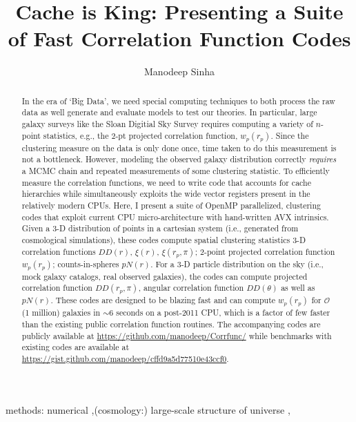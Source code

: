 \documentclass[preprint,authoryear,12pt]{elsarticle}
\newcommand{\xir}{\ensuremath{{DD(r)}}\xspace}
\newcommand{\xiofr}{\ensuremath{{\xi(r)}}\xspace}
\newcommand{\wprp}{\ensuremath{{w_p(r_p)}}\xspace}
\newcommand{\xirppi}{\ensuremath{{\xi(r_p,\pi)}}\xspace}
\newcommand{\cis}{\ensuremath{{pN(r)}}\xspace}
\newcommand{\ddrppi}{\ensuremath{{DD(r_p,\pi)}}\xspace}
\newcommand{\wtheta}{\ensuremath{{DD(\theta)}}\xspace}
\begin{document}
\begin{frontmatter}

\title{Cache is King: Presenting a Suite of Fast Correlation Function Codes}

\author[ms]{Manodeep Sinha}
\address[ms]{6902 Stevenson Center, Department of Physics \& Astronomy, Vanderbilt University, Nashville, TN 37235}

\begin{abstract}
In the era of `Big Data', we need special computing techniques to both process the raw data as well 
generate and evaluate models to test our theories. In particular, large galaxy surveys
like the Sloan Digitial Sky Survey requires computing a variety of $n$-point statistics, e.g., the 
2-pt projected correlation function, $\wprp$. 
Since the clustering measure on the data is only done once, time taken to do
this measurement is not a bottleneck. However, modeling the observed galaxy distribution correctly
{\em requires} a MCMC chain and repeated measurements of some clustering statistic. To efficiently 
measure the correlation functions, we need to write code that accounts for cache hierarchies while 
simultaneously exploits the wide vector registers present in the relatively modern CPUs.  
Here, I present a suite of OpenMP parallelized, clustering codes that exploit current CPU micro-architecture with hand-written AVX 
intrinsics. Given a 3-D distribution of points in a cartesian system (i.e.,
generated from cosmological simulations), these codes compute spatial clustering statistics 3-D correlation functions \xir, \xiofr, \xirppi; 2-point 
projected correlation function \wprp; counts-in-spheres \cis. For a 3-D
particle distribution on the sky (i.e., mock galaxy catalogs, real observed galaxies), the codes can compute 
projected correlation function \ddrppi, angular correlation function \wtheta as well as \cis. These codes are designed to be blazing fast 
and can compute \wprp for $\mathcal{O}$(1 million) galaxies in $\sim 6$ seconds on a post-2011 CPU, which is a factor of few faster than 
the existing public correlation function routines.  The accompanying codes are
publicly available at \url{https://github.com/manodeep/Corrfunc/} while
benchmarks with existing codes are available at \url{https://gist.github.com/manodeep/cffd9a5d77510e43ccf0}.

\end{abstract}

\begin{keyword}
methods: numerical \sep (cosmology:) large-scale structure of universe \sep
\end{keyword}

\end{frontmatter}
\end{document}
